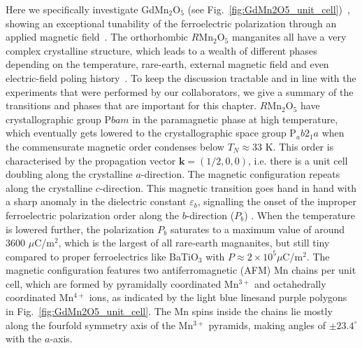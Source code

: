Here we specifically investigate GdMn$_2$O$_5$ (see Fig.~\ref{fig:GdMn2O5_unit_cell})~\cite{Khomskii2009}, showing an exceptional tunability of the ferroelectric polarization through an applied magnetic field~\cite{Lee13}.
The orthorhombic $R$Mn$_2$O$_5$ manganites all have a very complex crystalline structure, which leads to a wealth of different phases depending on the temperature, rare-earth, external magnetic field and even electric-field poling history~\cite{Zheng2019}.
To keep the discussion tractable and in line with the experiments that were performed by our collaborators, we give a summary of the transitions and phases that are important for this chapter.
$R$Mn$_2$O$_5$ have crystallographic group P$bam$ \cite{Alonso97} in the paramagnetic phase at high temperature, which eventually gets lowered to the crystallographic space group P$_ab2_1a$ when the commensurate magnetic order condenses below $T_{N} \approx 33$ K.
This order is characterised by the propagation vector $\bm{k} = (1/2, 0, 0)$, i.e. there is a unit cell doubling along the crystalline $a$-direction.
The magnetic configuration repeats along the crystalline $c$-direction. This magnetic transition goes hand in hand with a sharp anomaly in the dielectric constant $\varepsilon_b$, signalling the onset of the improper ferroelectric polarization order along the $b$-direction ($P_b$) \cite{Lee13}.
When the temperature is lowered further, the polarization $P_b$ saturates to a maximum value of around 3600 $\mu$C/m$^2$, which is the largest of all rare-earth magnanites, but still tiny compared to proper ferroelectrics like BaTiO$_3$ with $P \approx 2 \times 10^5 \mu $C/m$^2$.
The magnetic configuration features two antiferromagnetic (AFM) Mn chains per unit cell, which are formed by pyramidally coordinated Mn$^{3+}$ and octahedrally coordinated Mn$^{4+}$ ions, as indicated by the light blue linesand purple polygons in Fig.~\ref{fig:GdMn2O5_unit_cell}. The Mn spins inside the chains lie mostly along the fourfold symmetry axis of the Mn$^{3+}$ pyramids, making angles of $\pm 23.4^\circ$ with the $a$-axis.

